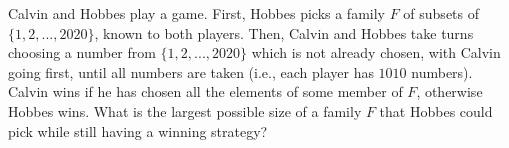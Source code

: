 Calvin and Hobbes play a game. First, Hobbes picks a family $F$ of subsets of $\{1, 2, . . . , 2020\}$, known to both players. Then, Calvin and Hobbes take turns choosing a number from $\{1, 2, . . . , 2020\}$ which is not already chosen, with Calvin going first, until all numbers are taken (i.e., each player has $1010$ numbers). Calvin wins if he has chosen all the elements of some member of $F$, otherwise Hobbes wins. What is the largest possible size of a family $F$ that Hobbes could pick while still having a winning strategy?
